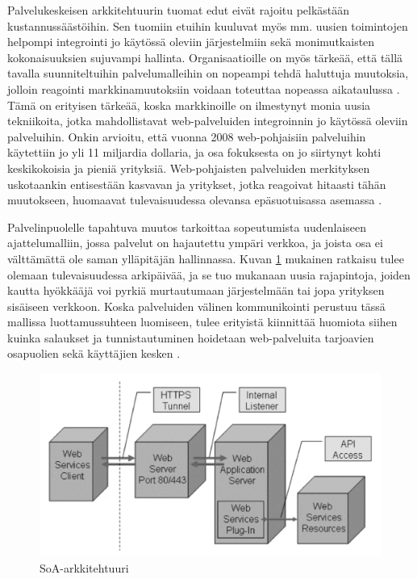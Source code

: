 Palvelukeskeisen arkkitehtuurin tuomat edut eivät rajoitu pelkästään
kustannussäästöihin. Sen tuomiin etuihin kuuluvat myös mm. uusien toimintojen
helpompi integrointi jo käytössä oleviin järjestelmiin sekä monimutkaisten
kokonaisuuksien sujuvampi hallinta. Organisaatioille on myös tärkeää, että tällä
tavalla suunniteltuihin palvelumalleihin on nopeampi tehdä haluttuja muutoksia, jolloin 
reagointi markkinamuutoksiin voidaan toteuttaa nopeassa aikataulussa \cite{WEB2c}. Tämä on
erityisen tärkeää, koska markkinoille on ilmestynyt monia uusia tekniikoita,
jotka mahdollistavat web-palveluiden integroinnin jo käytössä oleviin
palveluihin. Onkin arvioitu, että vuonna 2008 web-pohjaisiin palveluihin
käytettiin jo yli 11 miljardia dollaria, ja osa fokuksesta on jo siirtynyt
kohti keskikokoisia ja pieniä yrityksiä. Web-pohjaisten palveluiden merkityksen
uskotaankin entisestään kasvavan ja yritykset, jotka reagoivat hitaasti tähän
muutokseen, huomaavat tulevaisuudessa olevansa epäsuotuisassa asemassa \cite{WEB2b}.

Palvelinpuolelle tapahtuva muutos tarkoittaa sopeutumista uudenlaiseen
ajattelumalliin, jossa palvelut on hajautettu ympäri verkkoa, ja joista osa ei
välttämättä ole saman ylläpitäjän hallinnassa. Kuvan \ref{soa} mukainen ratkaisu
tulee olemaan tulevaisuudessa arkipäivää, ja se tuo mukanaan uusia rajapintoja,
joiden kautta hyökkääjä voi pyrkiä murtautumaan järjestelmään tai jopa
yrityksen sisäiseen verkkoon. Koska palveluiden välinen kommunikointi perustuu
tässä mallissa luottamussuhteen luomiseen, tulee erityistä kiinnittää huomiota
siihen kuinka salaukset ja tunnistautuminen hoidetaan web-palveluita tarjoavien
osapuolien sekä käyttäjien kesken \cite{WEB2b}.

\begin{figure}[htp]
\centering
\includegraphics[width=12cm]{pics/soa.pdf}
\caption{SoA-arkkitehtuuri}
\label{soa}
\end{figure}

